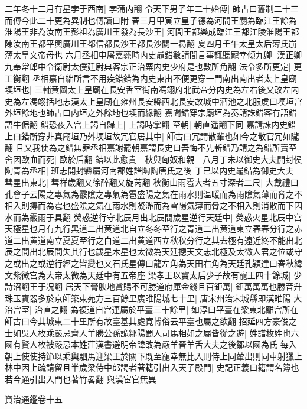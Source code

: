 二年冬十二月有星孛于西南|{
	孛蒲内翻}
令天下男子年二十始傅|{
	師古曰舊制二十三而傅今此二十更為異制也傅讀曰附}
春三月甲寅立皇子德為河間王閼為臨江王餘為淮陽王非為汝南王彭祖為廣川王發為長沙王|{
	河間王都樂成臨江王都江陵淮陽王都陳汝南王都平輿廣川王都信都長沙王都長沙閼一曷翻}
夏四月壬午太皇太后薄氏崩|{
	薄太皇文帝母也}
六月丞相申屠嘉薨時内史鼂錯數請間言事輒聽寵幸傾九卿|{
	漢正卿九奉常郎中令衛尉太僕廷尉典客宗正治粟内史少府是也數所角翻}
法令多所更定|{
	更工衡翻}
丞相嘉自絀所言不用疾錯錯為内史東出不便更穿一門南出南出者太上皇廟堧垣也|{
	三輔黄圖太上皇廟在長安香室街南馮翊府北武帝分内史為左右後又改左内史為左馮翊括地志漢太上皇廟在雍州長安縣西北長安故城中酒池之北服䖍曰堧垣宫外垣餘地也師古曰内垣之外餘地也堧而緣翻}
嘉聞錯穿宗廟垣為奏請誅錯客有語錯|{
	語牛倨翻}
錯恐夜入宫上謁自歸上|{
	上謁時掌翻}
至朝|{
	朝直遥翻下同}
嘉請誅内史錯上曰錯所穿非真廟垣乃外堧垣故冗官居其中|{
	師古曰冗謂散輩也如今之散官冗如隴翻}
且又我使為之錯無罪丞相嘉謝罷朝嘉謂長史曰吾悔不先斬錯乃請之為錯所賣至舍因歐血而死|{
	歐於后翻}
錯以此愈貴　秋與匈奴和親　八月丁未以御史大夫開封侯陶青為丞相|{
	班志開封縣屬河南郡姓譜陶陶唐氏之後}
丁巳以内史鼂錯為御史大夫　彗星出東北|{
	彗祥歲翻又徐醉翻又旋芮翻}
秋衡山雨雹大者五寸深者二尺|{
	大戴禮曰孔會子云陽之專氣為霰隂之專氣為雹盛陽之氣在雨水則温暖而為雨隂氣薄而脅之不相入則摶而為雹也盛隂之氣在雨水則凝滯而為雪陽氣薄而脅之不相入則消散而下因水而為霰雨于具翻}
熒惑逆行守北辰月出北辰間歲星逆行天廷中|{
	熒惑火星北辰中宫天極星也月有九行黑道二出黄道北自立冬冬至行之青道二出黄道東立春春分行之赤道二出黄道南立夏夏至行之白道二出黄道西立秋秋分行之其去極有遠近終不能出北辰之間出北辰間失其行也歲星木星也太微為天廷摠天文志北極及太微人君之位或守之或出之或逆行經之皆變也又石氏星傳曰龍左角為天田右角為天廷孔穎達曰春秋緯文紫微宫為大帝太微為天廷中有五帝座}
梁孝王以竇太后少子故有寵王四十餘城|{
	少詩沼翻王于况翻}
居天下膏腴地賞賜不可勝道府庫金錢且百鉅萬|{
	鉅萬萬萬也勝音升}
珠玉寶器多於京師築東苑方三百餘里廣睢陽城七十里|{
	唐宋州治宋城縣即漢睢陽}
大治宫室|{
	治直之翻}
為複道自宫連屬於平臺三十餘里|{
	如淳曰平臺在梁東北離宫所在師古曰今其城東二十里所有故臺基其處寛博俗云平臺也屬之欲翻}
招延四方豪俊之士如吳人枚乘嚴忌齊人羊勝公孫詭鄒陽蜀人司馬相如之屬皆從之遊|{
	姓譜枚姓也六國有賢人枚被嚴忌本姓莊漢書避明帝諱改為嚴羊晉羊舌大夫之後鄒以國為氏}
每入朝上使使持節以乘輿駟馬迎梁王於關下既至寵幸無比入則侍上同輦出則同車射獵上林中因上疏請留且半歲梁侍中郎謁者著籍引出入天子殿門|{
	史記正義曰籍謂名簿也若今通引出入門也著竹畧翻}
與漢宦官無異

資治通鑑卷十五
